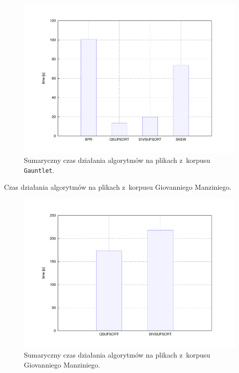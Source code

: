 \begin{figure}[ht]
   \begin{center}
        \includegraphics[width=\linewidth]{figures/results/sun-gauntlet.pdf}
    \end{center}        
    \caption{Sumaryczny czas działania algorytmów na plikach z~korpusu \texttt{Gauntlet}.}%
    \label{rys:sun-gauntlet}
\end{figure} 

\begin{table}[ht]
    \begin{center}        
         
    \end{center}                         
    \caption{Czas działania algorytmów na plikach z~korpusu Giovanniego Manziniego.}%
    \label{tab:sun-manzini}
\end{table}

\begin{figure}[ht]
   \begin{center}
        \includegraphics[width=\linewidth]{figures/results/sun-manzini.pdf}
    \end{center}        
    \caption{Sumaryczny czas działania algorytmów na plikach z~korpusu Giovanniego Manziniego.}%
    \label{rys:sun-manzini}
\end{figure} 


